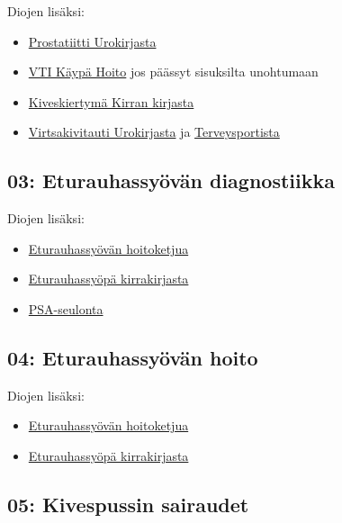 \documentclass[
]{book}
\providecommand{\tightlist}{%
  \setlength{\itemsep}{0pt}\setlength{\parskip}{0pt}}
\begin{document}
Diojen lisäksi:

\begin{itemize}
\tightlist
\item
  \href{https://www.oppiportti.fi/oppikirjat/uro02102}{Prostatiitti Urokirjasta}
\item
  \href{https://www.kaypahoito.fi/hoi10050}{VTI Käypä Hoito} jos päässyt sisuksilta unohtumaan
\item
  \href{https://www.oppiportti.fi/oppikirjat/kia00290}{Kiveskiertymä Kirran kirjasta}
\item
  \href{https://www.oppiportti.fi/oppikirjat/uro01600}{Virtsakivitauti Urokirjasta} ja \href{https://www.terveysportti.fi/apps/dtk/ltk/article/ykt00303}{Terveysportista}
\end{itemize}

\subsection{03: Eturauhassyövän diagnostiikka}\label{Eturauhassyovan-diagnostiikka}

Diojen lisäksi:

\begin{itemize}
\tightlist
\item
  \href{https://www.pirha.fi/web/hoito-ja-palveluketjut/eturauhassyopapotilaan-hoitoketju}{Eturauhassyövän hoitoketjua}
\item
  \href{https://www.oppiportti.fi/oppikirjat/kia00313}{Eturauhassyöpä kirrakirjasta}
\item
  \href{https://www.terveysportti.fi/apps/dtk/ltk/article/ykt02036/}{PSA-seulonta}
\end{itemize}

\subsection{04: Eturauhassyövän hoito}\label{Eturauhassyovan-hoito}

Diojen lisäksi:

\begin{itemize}
\tightlist
\item
  \href{https://www.pirha.fi/web/hoito-ja-palveluketjut/eturauhassyopapotilaan-hoitoketju}{Eturauhassyövän hoitoketjua}
\item
  \href{https://www.oppiportti.fi/oppikirjat/kia00313}{Eturauhassyöpä kirrakirjasta}
\end{itemize}

\subsection{05: Kivespussin sairaudet}\label{kivespussin-sairaudet}
\end{document}
